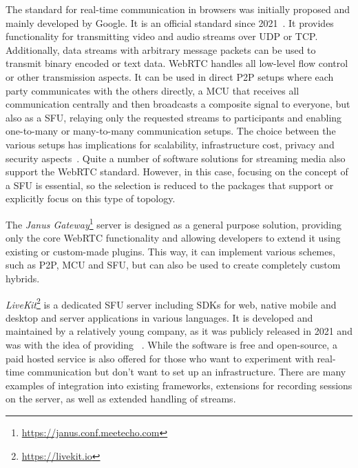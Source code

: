 The standard for real-time communication in browsers was initially proposed and mainly developed by Google.
It is an official standard since 2021~\parencite{webRtcOfficialWebStandard}.
It provides functionality for transmitting video and audio streams over \ac{UDP} or \ac{TCP}.
Additionally, data streams with arbitrary message packets can be used to transmit binary encoded or text data.
WebRTC handles all low-level flow control or other transmission aspects.
It can be used in direct \ac{P2P} setups where each party communicates with the others directly, a \ac{MCU} that receives all communication centrally and then broadcasts a composite signal to everyone, but also as a \ac{SFU}, relaying only the requested streams to participants and enabling one-to-many or many-to-many communication setups.
The choice between the various setups has implications for scalability, infrastructure cost, privacy and security aspects~\parencite{webRtcArchitectures}.
Quite a number of software solutions for streaming media also support the WebRTC standard.
However, in this case, focusing on the concept of a \ac{SFU} is essential, so the selection is reduced to the packages that support or explicitly focus on this type of topology.



The \emph{Janus Gateway}\footnote{\url{https://janus.conf.meetecho.com}} server is designed as a general purpose solution, providing only the core \ac{WebRTC} functionality and allowing developers to extend it using existing or custom-made plugins.
This way, it can implement various schemes, such as \ac{P2P}, \ac{MCU} and \ac{SFU}, but can also be used to create completely custom hybrids.

\emph{LiveKit}\footnote{\url{https://livekit.io}} is a dedicated \ac{SFU} server including \ac{SDK}s for web, native mobile and desktop and server applications in various languages.
It is developed and maintained by a relatively young company, as it was publicly released in 2021 and was  with the idea of providing ~\parencite{livekitAbout}.
While the software is free and open-source, a paid hosted service is also offered for those who want to experiment with real-time communication but don't want to set up an infrastructure.
There are many examples of integration into existing frameworks, extensions for recording sessions on the server, as well as extended handling of streams.

